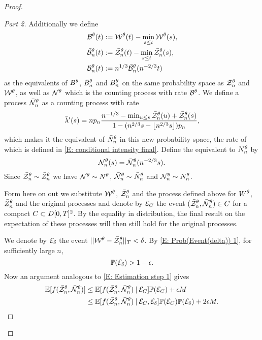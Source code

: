 \begin{proof}
\begin{proof}[Part 2]
Additionally we define \label{I: alt processes}
\begin{equation} 
	\begin{aligned}
	\mathcal{B}^{\theta}(t) &:= \mathcal{W}^{\theta}(t) - \min_{s \leq t}\mathcal{W}^{\theta}(s), \\
	\bar{\mathcal{B}}^{\theta}_n(t) &:= \bar{\mathcal{Z}}^{\theta}_n(t) - \min_{s \leq t}\bar{\mathcal{Z}}^{\theta}_n(s), \\
	\mathcal{B}_n^{\theta}(t) &:= n^{1 / 3}\bar{\mathcal{B}}^{\theta}_n(n^{-2 / 3}t)	
	\end{aligned}
\end{equation}
as the equivalents of $B^{\theta}$, $\bar{B}_n^{\theta}$ and $B_n^{\theta}$ on the same probability space as $\bar{\mathcal{Z}}^{\theta}_n$ and $\mathcal{W}^{\theta}$,
as well as $\mathcal{N}^{\theta}$ which is the counting process with rate $\mathcal{B}^{\theta}$.
We define a process $\bar{\mathcal{N}}_n^{\theta}$ as a counting process with rate
\begin{equation}
\bar{\lambda}'(s) = n p_n \frac{n^{-1 / 3} - \min_{u \leq s} \bar{\mathcal{Z}}^{\theta}_n(u) + \bar{\mathcal{Z}}^{\theta}_n(s)}{1 - (n^{2 / 3}s - \lfloor n^{2 / 3}s\rfloor)p_n},
\end{equation}
which makes it the equivalent of $\bar{N}_n^{\theta}$ in this new probability space, the rate of which is defined in \eqref{E: conditional intensity final}.
Define the equivalent to $N_n^{\theta}$ by 
\begin{equation}
	\mathcal{N}_n^{\theta}(s) = \bar{\mathcal{N}}_n^{\theta}(n^{-2 / 3}s).
\end{equation}
Since $\bar{\mathcal{Z}}^{\theta}_n \sim \bar{Z}^{\theta}_n$ we have $\mathcal{N}^{\theta} \sim N^{\theta}$, $\bar{\mathcal{N}}_n^{\theta} \sim \bar{N}_n^{\theta}$ and $\mathcal{N}_n^{\theta} \sim N_n^{\theta}$.

Form here on out we substitute $\mathcal{W}^{\theta}$, $\bar{\mathcal{Z}}^{\theta}_n$ and the process defined above for $W^{\theta}$, $\bar{Z}^{\theta}_n$ and the original processes
and denote by $\mathcal{E}_{C}$ the event $(\bar{\mathcal{Z}}^{\theta}_n, \bar{\mathcal{N}}_n^{\theta}) \in C$ for a compact $C \subset D[0, T]^2$.
By the equality in distribution, the final result on the expectation of these processes will then still hold for the original processes.

We denote by $\mathcal{E}_{\delta}$ the event $||\mathcal{W}^{\theta} - \bar{\mathcal{Z}}^{\theta}_n||_T < \delta$.
By \eqref{E: Prob(Event(delta)) 1}, for sufficiently large $n$, 
\begin{equation} \label{E: Prob Event delta}
\mathbb{P}(\mathcal{E}_{\delta}) > 1 - \epsilon.
\end{equation}
Now an argument analogous to \eqref{E: Estimation step 1} gives
\begin{equation} \label{E: Estimation step 2}
\begin{aligned}
\mathbb{E}[f(\bar{\mathcal{Z}}^{\theta}_n, \bar{\mathcal{N}}_n^{\theta}) ] 
&\leq \mathbb{E}[f(\bar{\mathcal{Z}}^{\theta}_n, \bar{\mathcal{N}}_n^{\theta}) \: | \: \mathcal{E}_{C}]\mathbb{P}(\mathcal{E}_{C}) + \epsilon M \\
&\leq \mathbb{E}[f(\bar{\mathcal{Z}}^{\theta}_n, \bar{\mathcal{N}}_n^{\theta}) \: | \: \mathcal{E}_{C}, \mathcal{E}_{\delta}]\mathbb{P}(\mathcal{E}_{C})\mathbb{P}(\mathcal{E}_{\delta}) + 2 \epsilon M.
\end{aligned}
\end{equation}


\end{proof}
\end{proof}
